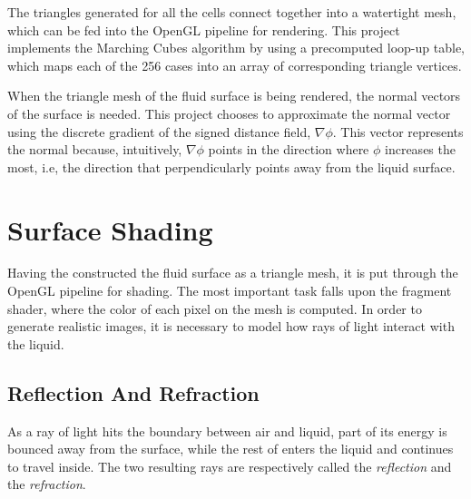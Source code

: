 The triangles generated for all the cells connect together into a watertight mesh, which can be fed into the OpenGL pipeline for rendering. This project implements the Marching Cubes algorithm by using a precomputed loop-up table, which maps each of the 256 cases into an array of corresponding triangle vertices.

When the triangle mesh of the fluid surface is being rendered, the normal vectors of the surface is needed. This project chooses to approximate the normal vector using the discrete gradient of the signed distance field, $\nabla \phi$. This vector represents the normal because, intuitively, $\nabla \phi$ points in the direction where $\phi$ increases the most, i.e, the direction that perpendicularly points away from the liquid surface.



\section{Surface Shading}

Having the constructed the fluid surface as a triangle mesh, it is put through the OpenGL pipeline for shading. The most important task falls upon the fragment shader, where the color of each pixel on the mesh is computed. In order to generate realistic images, it is necessary to model how rays of light interact with the liquid.

\subsection{Reflection And Refraction}
As a ray of light hits the boundary between air and liquid, part of its energy is bounced away from the surface, while the rest of enters the liquid and continues to travel inside. The two resulting rays are respectively called the \textit{reflection} and the \textit{refraction}. 

